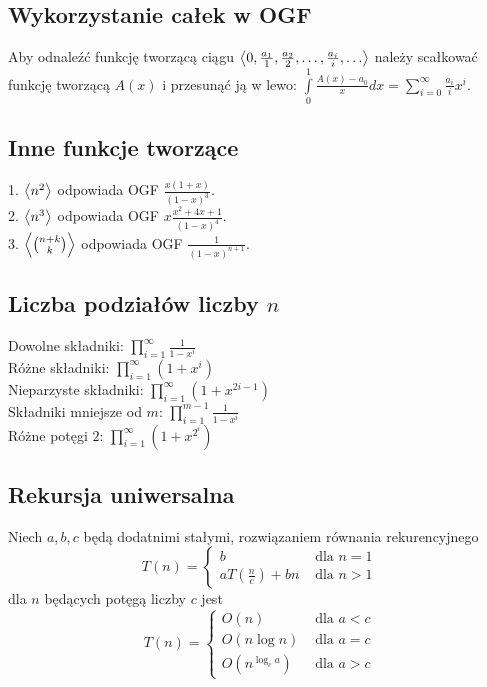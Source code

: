 \subsection*{Wykorzystanie całek w OGF}
Aby odnaleźć funkcję tworzącą ciągu 
$\left\langle 0, \frac{a_1}{1}, \frac{a_2}{2}, \ldots, \frac{a_i}{i}, \ldots \right\rangle$ należy
scałkować funkcję tworzącą $A(x)$ i przesunąć ją w lewo:
$\int\limits_{0}^{1} \frac{A(x) - a_0}{x} dx = 
\sum\limits_{i=0}^{\infty} \frac{a_i}{i} x^{i}$.

\subsection*{Inne funkcje tworzące}
1. $\left\langle n^2 \right\rangle$ odpowiada OGF $\frac{x(1+x)}{(1-x)^3}$. \\
2. $\left\langle n^3 \right\rangle$ odpowiada OGF $x \frac{x^2 + 4x + 1}{(1-x)^4}$. \\
3. $\left\langle \binom{n+k}{k} \right\rangle$ odpowiada OGF $\frac{1}{(1-x)^{n+1}}$.

\subsection*{Liczba podziałów liczby $n$}
Dowolne składniki: $\prod\limits_{i=1}^{\infty} \frac{1}{1 - x^i}$ \\
Różne składniki: $\prod\limits_{i=1}^{\infty} (1 + x^i)$ \\
Nieparzyste składniki: $\prod\limits_{i=1}^{\infty} (1 + x^{2i-1})$ \\
Składniki mniejsze od $m$: $\prod\limits_{i=1}^{m-1} \frac{1}{1 - x^i}$ \\
Różne potęgi $2$: $\prod\limits_{i=1}^{\infty} (1 + x^{2^i})$

\subsection*{Rekursja uniwersalna}
Niech $a, b, c$ będą dodatnimi stałymi, rozwiązaniem równania rekurencyjnego
$$
T(n) =
\begin{cases}
    b                    &\text{ dla } n = 1\\
    aT(\frac{n}{c}) + bn &\text{ dla } n > 1
\end{cases}
$$
dla $n$ będących potęgą liczby $c$ jest
$$
T(n) =
\begin{cases}
    O(n)                         &\text{ dla } a < c \\
    O(n \log n)                  &\text{ dla } a = c \\
    O\left( n^{\log_c a} \right) &\text{ dla } a > c
\end{cases}
$$